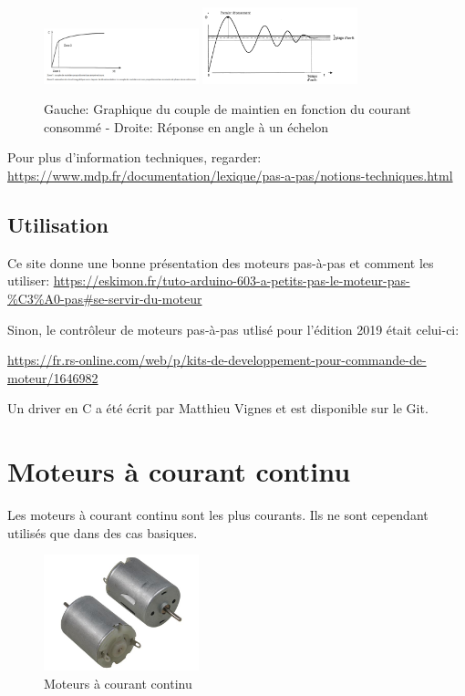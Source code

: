 \documentclass[a4paper, 11pt]{report}
\begin{document}
\begin{figure}[h!]
\begin{centering}
\caption{Gauche: Graphique du couple de maintien en fonction du courant consommé - Droite: Réponse en angle à un échelon}
\includegraphics[width=0.4\textwidth]{images/CoupleMaintien.png}
\includegraphics[width=0.4\textwidth]{images/reponse_indicielleMPP.png}
\par\end{centering}
\end{figure}

Pour plus d'information techniques, regarder: \url{https://www.mdp.fr/documentation/lexique/pas-a-pas/notions-techniques.html}

\subsection{Utilisation}

Ce site donne une bonne présentation des moteurs pas-à-pas et comment les utiliser: \url{https://eskimon.fr/tuto-arduino-603-a-petits-pas-le-moteur-pas-\%C3\%A0-pas#se-servir-du-moteur}

Sinon, le contrôleur de moteurs pas-à-pas utlisé pour l'édition 2019 était celui-ci:

\url{https://fr.rs-online.com/web/p/kits-de-developpement-pour-commande-de-moteur/1646982}

Un driver en C a été écrit par Matthieu Vignes et est disponible sur le Git.

\section{Moteurs à courant continu}

Les moteurs à courant continu sont les plus courants. Ils ne sont cependant utilisés que dans des cas basiques.

\begin{figure}[h!]
\begin{centering}
\includegraphics[width=0.4\textwidth]{images/MoteurDC.jpeg}
\caption{Moteurs à courant continu}
\par\end{centering}
\end{figure}
\end{document}
